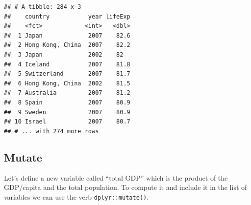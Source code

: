 \documentclass[12pt,]{article}
\newenvironment{Shaded}{\begin{snugshade}}{\end{snugshade}}
\newcommand{\KeywordTok}[1]{\textcolor[rgb]{0.13,0.29,0.53}{\textbf{#1}}}
\newcommand{\DataTypeTok}[1]{\textcolor[rgb]{0.13,0.29,0.53}{#1}}
\newcommand{\DecValTok}[1]{\textcolor[rgb]{0.00,0.00,0.81}{#1}}
\newcommand{\StringTok}[1]{\textcolor[rgb]{0.31,0.60,0.02}{#1}}
\newcommand{\CommentTok}[1]{\textcolor[rgb]{0.56,0.35,0.01}{\textit{#1}}}
\newcommand{\OperatorTok}[1]{\textcolor[rgb]{0.81,0.36,0.00}{\textbf{#1}}}
\newcommand{\NormalTok}[1]{#1}
\begin{document}
\begin{Shaded}
\end{Shaded}

\begin{verbatim}
## # A tibble: 284 x 3
##    country           year lifeExp
##    <fct>            <int>   <dbl>
##  1 Japan             2007    82.6
##  2 Hong Kong, China  2007    82.2
##  3 Japan             2002    82  
##  4 Iceland           2007    81.8
##  5 Switzerland       2007    81.7
##  6 Hong Kong, China  2002    81.5
##  7 Australia         2007    81.2
##  8 Spain             2007    80.9
##  9 Sweden            2007    80.9
## 10 Israel            2007    80.7
## # ... with 274 more rows
\end{verbatim}

\subsection{Mutate}\label{mutate}

Let's define a new variable called ``total GDP'' which is the product of
the GDP/capita and the total population. To compute it and include it in
the list of variables we can use the verb \texttt{dplyr::mutate()}.

\begin{Shaded}
\end{Shaded}
\end{document}
